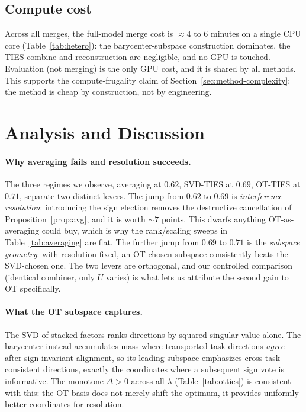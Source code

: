 \documentclass[11pt]{article}
\newcommand{\otties}{\textsc{OT-TIES}}
\newcommand{\svdties}{\textsc{SVD-TIES}}
\begin{document}
\subsection{Compute cost}
\label{sec:results-compute}
Across all merges, the full-model merge cost is $\approx 4$ to $6$ minutes on a single CPU core
(Table~\ref{tab:hetero}): the barycenter-subspace construction dominates, the TIES combine and
reconstruction are negligible, and no GPU is touched. Evaluation (not merging) is the only GPU cost, and
it is shared by all methods. This supports the compute-frugality claim of
Section~\ref{sec:method-complexity}: the method is cheap by construction, not by engineering.

\section{Analysis and Discussion}
\label{sec:analysis}

\paragraph{Why averaging fails and resolution succeeds.}
The three regimes we observe, averaging at $0.62$, \svdties{} at $0.69$, \otties{} at $0.71$, separate
two distinct levers. The jump from $0.62$ to $0.69$ is \emph{interference resolution}: introducing the
sign election removes the destructive cancellation of Proposition~\ref{prop:avg}, and it is worth
$\sim\!7$ points. This dwarfs anything OT-as-averaging could buy, which is why the rank/scaling sweeps in
Table~\ref{tab:averaging} are flat. The further jump from $0.69$ to $0.71$ is the \emph{subspace
geometry}: with resolution fixed, an OT-chosen subspace consistently beats the SVD-chosen one. The two
levers are orthogonal, and our controlled comparison (identical combiner, only $U$ varies) is what lets
us attribute the second gain to OT specifically.

\paragraph{What the OT subspace captures.}
The SVD of stacked factors ranks directions by squared singular value alone. The barycenter instead
accumulates mass where transported task directions \emph{agree} after sign-invariant alignment, so its
leading subspace emphasizes cross-task-consistent directions, exactly the coordinates where a
subsequent sign vote is informative. The monotone $\Delta>0$ across all $\lambda$
(Table~\ref{tab:otties}) is consistent with this: the OT basis does not merely shift the optimum, it
provides uniformly better coordinates for resolution.
\end{document}
